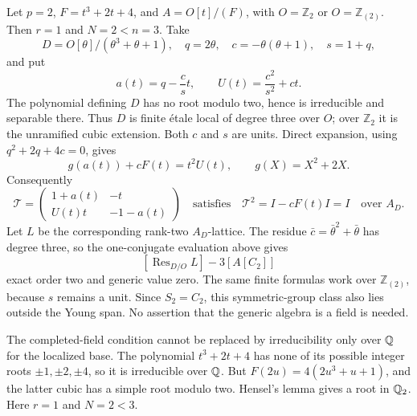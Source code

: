 \begin{example}\label{ex:singular-monic-p2-lower-coefficient}
Let \(p=2\), \(F=t^3+2t+4\), and \(A=O[t]/(F)\), with \(O=\mathbb Z_2\) or \(O=\mathbb Z_{(2)}\).  Then \(r=1\) and \(N=2<n=3\).
Take
\[
 D=O[\theta]/(\theta^3+\theta+1),\quad
 q=2\theta,\quad c=-\theta(\theta+1),\quad s=1+q,
\]
and put
\[
 a(t)=q-\frac{c}{s}t,\qquad
 U(t)=\frac{c^2}{s^2}+ct.
\]
The polynomial defining \(D\) has no root modulo two, hence is
irreducible and separable there.  Thus \(D\) is finite \'etale local
of degree three over \(O\); over \(\mathbb Z_2\) it is the
unramified cubic extension.  Both \(c\) and \(s\) are units.
Direct expansion, using \(q^2+2q+4c=0\), gives
\[
 g(a(t))+cF(t)=t^2U(t),\qquad g(X)=X^2+2X.
\]
Consequently
\[
 \mathcal T=
 \begin{pmatrix}1+a(t)&-t\\ U(t)t&-1-a(t)\end{pmatrix}
 \quad\text{satisfies}\quad
 \mathcal T^2=I-cF(t)I=I
 \quad\text{over }A_D.
\]
Let \(L\) be the corresponding rank-two \(A_D\)-lattice.
The residue \(\bar c=\bar\theta^2+\bar\theta\) has degree three,
so the one-conjugate evaluation above gives
\[
 \left[\operatorname{Res}_{D/O}L\right]-3[A[C_2]]
\]
exact order two and generic value zero.  The same finite formulas
work over \(\mathbb Z_{(2)}\), because \(s\) remains a unit.
Since \(S_2=C_2\), this symmetric-group class also lies outside the
Young span.  No assertion that the generic algebra is a field is needed.
\end{example}

\begin{remark}\label{rem:distinguished-completed-field-hypothesis}
The completed-field condition cannot be replaced by irreducibility
only over \(\mathbb Q\) for the localized base.  The polynomial
\(t^3+2t+4\) has none of its possible integer roots
\(\pm1,\pm2,\pm4\), so it is irreducible over \(\mathbb Q\).
But \(F(2u)=4(2u^3+u+1)\), and the latter cubic has a simple
root modulo two.  Hensel's lemma gives a root in \(\mathbb Q_2\).
Here \(r=1\) and \(N=2<3\).
\end{remark}
